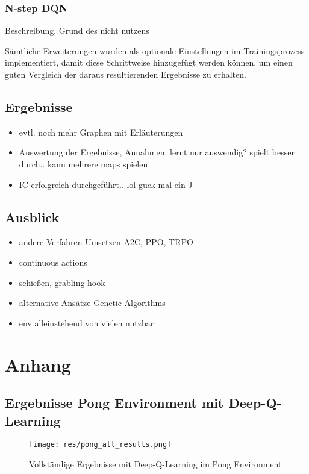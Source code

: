 \documentclass[11pt]{scrartcl}
\begin{document}
\subsubsection{N-step DQN} %
Beschreibung, Grund des nicht nutzens
\newline

\noindent
Sämtliche Erweiterungen wurden als optionale Einstellungen im Trainingsprozess implementiert,
damit diese Schrittweise hinzugefügt werden können, um einen guten Vergleich der daraus
resultierenden Ergebnisse zu erhalten.

\subsection{Ergebnisse} %
\begin{itemize}
\itemsep0pt	
\item evtl. noch mehr Graphen mit Erläuterungen
\item Auswertung der Ergebnisse, Annahmen: lernt nur auswendig? spielt besser durch.. kann mehrere maps spielen
\item IC erfolgreich durchgeführt.. lol guck mal ein ^^
\end{itemize}

\subsection{Ausblick} %
\begin{itemize}
\itemsep0pt	
\item andere Verfahren Umsetzen A2C, PPO, TRPO
\item continuous actions
\item schießen, grabling hook
\item alternative Ansätze Genetic Algorithms
\item env alleinstehend von vielen nutzbar
\end{itemize}

\newpage
%


\newpage
\listoffigures 
\listoftables 

\newpage
\section{Anhang}

\subsection{Ergebnisse Pong Environment mit Deep-Q-Learning}
\begin{figure}[htp]
\centering
\texttt{[image: res/pong\_all\_results.png]}
\caption{Vollständige Ergebnisse mit Deep-Q-Learning im Pong Environment}
\label{fig:pong_all_results}
\end{figure}
\end{document}
